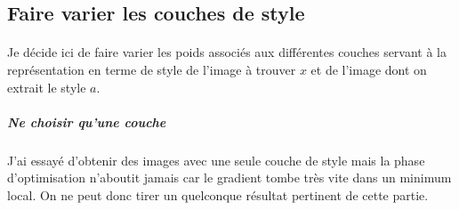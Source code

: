 \documentclass{article}
\begin{document}
\subsection*{Faire varier les couches de style}
\paragraph*{}
Je décide ici de faire varier les poids associés aux différentes couches servant à la représentation en terme de style de l'image à trouver $x$ et de l'image dont on extrait le style $a$.
\subparagraph*{Ne choisir qu'une couche}
J'ai essayé d'obtenir des images avec une seule couche de style mais la phase d'optimisation n’aboutit jamais car le gradient tombe très vite dans un minimum local. On ne peut donc tirer un quelconque résultat pertinent de cette partie.
\end{document}
